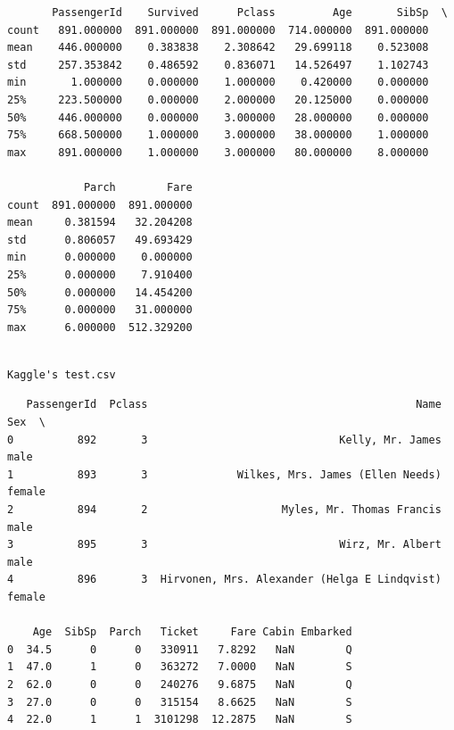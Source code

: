 \documentclass[11pt]{article}
\begin{document}
    
    
    \begin{verbatim}
       PassengerId    Survived      Pclass         Age       SibSp  \
count   891.000000  891.000000  891.000000  714.000000  891.000000   
mean    446.000000    0.383838    2.308642   29.699118    0.523008   
std     257.353842    0.486592    0.836071   14.526497    1.102743   
min       1.000000    0.000000    1.000000    0.420000    0.000000   
25%     223.500000    0.000000    2.000000   20.125000    0.000000   
50%     446.000000    0.000000    3.000000   28.000000    0.000000   
75%     668.500000    1.000000    3.000000   38.000000    1.000000   
max     891.000000    1.000000    3.000000   80.000000    8.000000   

            Parch        Fare  
count  891.000000  891.000000  
mean     0.381594   32.204208  
std      0.806057   49.693429  
min      0.000000    0.000000  
25%      0.000000    7.910400  
50%      0.000000   14.454200  
75%      0.000000   31.000000  
max      6.000000  512.329200  
    \end{verbatim}

    
    \begin{Verbatim}[commandchars=\\\{\}]

Kaggle's test.csv

    \end{Verbatim}

    
    \begin{verbatim}
   PassengerId  Pclass                                          Name     Sex  \
0          892       3                              Kelly, Mr. James    male   
1          893       3              Wilkes, Mrs. James (Ellen Needs)  female   
2          894       2                     Myles, Mr. Thomas Francis    male   
3          895       3                              Wirz, Mr. Albert    male   
4          896       3  Hirvonen, Mrs. Alexander (Helga E Lindqvist)  female   

    Age  SibSp  Parch   Ticket     Fare Cabin Embarked  
0  34.5      0      0   330911   7.8292   NaN        Q  
1  47.0      1      0   363272   7.0000   NaN        S  
2  62.0      0      0   240276   9.6875   NaN        Q  
3  27.0      0      0   315154   8.6625   NaN        S  
4  22.0      1      1  3101298  12.2875   NaN        S  
    \end{verbatim}

    
    
\end{document}

